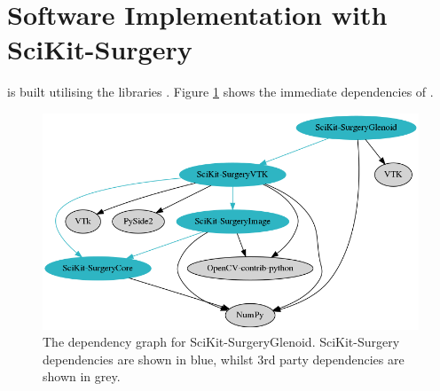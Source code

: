 \section{Software Implementation with SciKit-Surgery}
\sksglenoid is built utilising the \sksurgery libraries \cite{PMID:32436132}. Figure \ref{fig:deps} shows the immediate dependencies of \sksglenoidns.

\begin{figure}
	\begin{center}
		\includegraphics[width=0.6\linewidth]{figures/graphviz-f4a0d46f29de525cf2512540ebd2f3e3f3356594.png}
			\caption{\label{fig:deps}The dependency graph for SciKit-SurgeryGlenoid. SciKit-Surgery dependencies are shown in blue, whilst 3rd party dependencies are shown in grey.}
	\end{center}
\end{figure}
